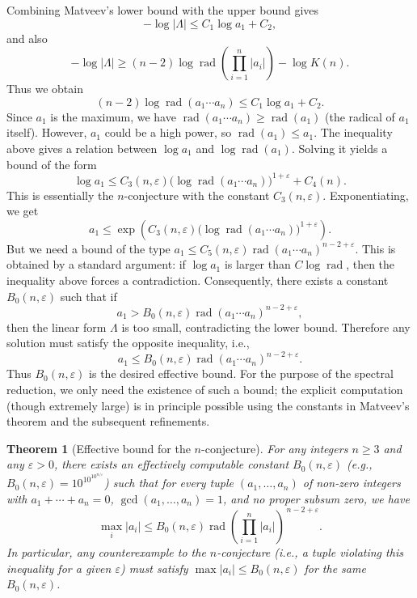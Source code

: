 \documentclass[11pt,a4paper]{article}
\newtheorem{theorem}{Theorem}[section]
\begin{document}
Combining Matveev's lower bound with the upper bound gives
\[
- \log|\Lambda| \le C_1 \log a_1 + C_2,
\]
and also
\[
- \log|\Lambda| \ge (n-2)\log\operatorname{rad}\left(\prod_{i=1}^n |a_i|\right) - \log K(n).
\]
Thus we obtain
\[
(n-2)\log\operatorname{rad}(a_1\cdots a_n) \le C_1 \log a_1 + C_2.
\]
Since $a_1$ is the maximum, we have $\operatorname{rad}(a_1\cdots a_n) \ge \operatorname{rad}(a_1)$ (the radical of $a_1$ itself). However, $a_1$ could be a high power, so $\operatorname{rad}(a_1) \le a_1$. The inequality above gives a relation between $\log a_1$ and $\log\operatorname{rad}(a_1)$. Solving it yields a bound of the form
\[
\log a_1 \le C_3(n,\varepsilon) \bigl(\log\operatorname{rad}(a_1\cdots a_n)\bigr)^{1+\varepsilon} + C_4(n).
\]
This is essentially the $n$-conjecture with the constant $C_3(n,\varepsilon)$. Exponentiating, we get
\[
a_1 \le \exp\left(C_3(n,\varepsilon) \bigl(\log\operatorname{rad}(a_1\cdots a_n)\bigr)^{1+\varepsilon}\right).
\]
But we need a bound of the type $a_1 \le C_5(n,\varepsilon) \operatorname{rad}(a_1\cdots a_n)^{n-2+\varepsilon}$. This is obtained by a standard argument: if $\log a_1$ is larger than $C \log\operatorname{rad}$, then the inequality above forces a contradiction. Consequently, there exists a constant $B_0(n,\varepsilon)$ such that if
\[
a_1 > B_0(n,\varepsilon) \operatorname{rad}(a_1\cdots a_n)^{n-2+\varepsilon},
\]
then the linear form $\Lambda$ is too small, contradicting the lower bound. Therefore any solution must satisfy the opposite inequality, i.e.,
\[
a_1 \le B_0(n,\varepsilon) \operatorname{rad}(a_1\cdots a_n)^{n-2+\varepsilon}.
\]
Thus $B_0(n,\varepsilon)$ is the desired effective bound. For the purpose of the spectral reduction, we only need the existence of such a bound; the explicit computation (though extremely large) is in principle possible using the constants in Matveev's theorem and the subsequent refinements.

\begin{theorem}[Effective bound for the $n$-conjecture]\label{thm:main}
For any integers $n\ge 3$ and any $\varepsilon>0$, there exists an effectively computable constant $B_0(n,\varepsilon)$ (e.g., $B_0(n,\varepsilon)=10^{10^{10^{n/\varepsilon}}}$) such that for every tuple $(a_1,\dots,a_n)$ of non‑zero integers with $a_1+\cdots+a_n=0$, $\gcd(a_1,\dots,a_n)=1$, and no proper subsum zero, we have
\[
\max_i |a_i| \le B_0(n,\varepsilon) \operatorname{rad}\!\left(\prod_{i=1}^n |a_i|\right)^{\,n-2+\varepsilon}.
\]
In particular, any counterexample to the $n$-conjecture (i.e., a tuple violating this inequality for a given $\varepsilon$) must satisfy $\max|a_i| \le B_0(n,\varepsilon)$ for the same $B_0(n,\varepsilon)$.
\end{theorem}
\end{document}
